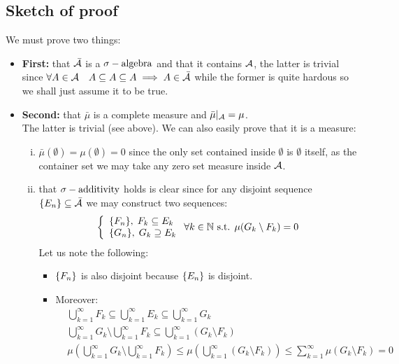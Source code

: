 \subsection*{Sketch of proof}
We  must prove two things:
\begin{itemize}
    \item \textbf{First:} that $\bar{\mathcal{A}}$ is a $\sigma-\text{algebra}$ and that it contains $\mathcal{A}$, the latter is trivial since $\forall A\in\mathcal{A} \quad A\subseteq A\subseteq A \implies A\in\bar{\mathcal{A}}$ while the former is quite hardous so we shall just assume it to be true.
    \item \textbf{Second:} that $\bar{\mu}$ is a complete measure and $\bar{\mu}|_{\mathcal{A}}=\mu$.\\
    The latter is trivial (see above). We can also easily prove that it is a measure:
    \begin{enumerate}[i)]
        \item $\bar{\mu}(\emptyset)=\mu(\emptyset)=0$ since the only set contained inside $\emptyset$ is $\emptyset$ itself, as the container set we may take any zero set measure inside $\mathcal{A}$.
        \item that $\sigma-\text{additivity}$ holds is clear since for any disjoint sequence $\{ E_n \}\subseteq\bar{\mathcal{A}}$ we may construct two sequences:
        \[
           \left\{ \begin{array}{l}
                \{ F_n \}, \; F_k \subseteq E_k \\
                \{ G_n \}, \; G_k \supseteq E_k
            \end{array} \right. \forall k\in\mathbb{N} \text{ s.t. } \mu(G_k\setminus F_k) = 0
        \]
        Let us note the following:
        \begin{itemize}
            \item $\{ F_n \}$ is also disjoint because $\{ E_n \}$ is disjoint.
            \item Moreover:
                \begin{align*}
                    & \bigcup_{k=1}^{\infty} F_k \subseteq \bigcup_{k=1}^{\infty} E_k \subseteq \bigcup_{k=1}^{\infty} G_k \\
                    & \bigcup_{k=1}^{\infty} G_k \setminus \bigcup_{k=1}^{\infty} F_k \subseteq \bigcup_{k=1}^{\infty} (G_k \setminus F_k ) \\
                    & \mu\left(\bigcup_{k=1}^{\infty} G_k \setminus \bigcup_{k=1}^{\infty} F_k \right) \leq \mu\left(\bigcup_{k=1}^{\infty} (G_k \setminus F_k )\right) \leq \sum_{k=1}^{\infty} \mu(G_k\setminus F_k) = 0
            \end{align*}

\end{itemize}
\end{enumerate}
\end{itemize}
